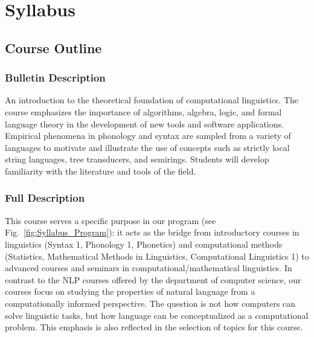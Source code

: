 \setcounter{chapter}{-1}
\chapter{Syllabus}
\label{cha:syllabus}
\setcounter{page}{1}


\section{Course Outline}

\subsection{Bulletin Description}
An introduction to the theoretical foundation of computational linguistics.
The course emphasizes the importance of algorithms, algebra, logic, and formal language theory in the development of new tools and software applications.
Empirical phenomena in phonology and syntax are sampled from a variety of languages to motivate and illustrate the use of concepts such as strictly local string languages, tree transducers, and semirings.
Students will develop familiarity with the literature and tools of the field.

\subsection{Full Description}

This course serves a specific purpose in our program (see Fig.~\vref{fig:Syllabus_Program}):
it acts as the bridge from introductory courses in linguistics (Syntax 1, Phonology 1, Phonetics) and computational methods (Statistics, Mathematical Methods in Linguistics, Computational Linguistics 1) to advanced courses and seminars in computational\slash mathematical linguistics.
In contrast to the NLP courses offered by the department of computer science, our courses focus on studying the properties of natural language from a computationally informed perspective.
The question is not how computers can solve linguistic tasks, but how language can be conceptualized as a computational problem.
This emphasis is also reflected in the selection of topics for this course.

